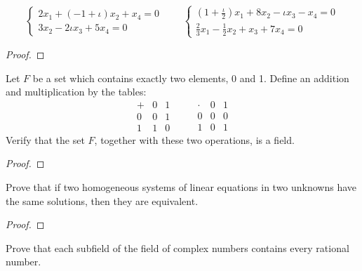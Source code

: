 \begin{exercise}
    \[
        \begin{cases}
            2x_{1} + (-1 + \iota)x_{2} + x_{4} = 0 \\
            3x_{2} - 2\iota x_{3} + 5x_{4} = 0
        \end{cases}
        \qquad
        \begin{cases}
            \left(1 + \frac{\iota}{2}\right)x_{1} + 8x_{2} - \iota x_{3} - x_{4} = 0 \\
            \frac{2}{3}x_{1} - \frac{1}{2}x_{2} + x_{3} + 7x_{4} = 0
        \end{cases}
    \]
\end{exercise}

\begin{proof}
\end{proof}

\begin{exercise}
    Let $F$ be a set which contains exactly two elements, 0 and 1. Define an addition and multiplication by the tables:
    \[
        \begin{array}{c|cc}
            + & 0 & 1 \\
            \hline
            0 & 0 & 1 \\
            1 & 1 & 0
        \end{array}
        \qquad
        \begin{array}{c|cc}
            \cdot & 0 & 1 \\
            \hline
            0 & 0 & 0 \\
            1 & 0 & 1
        \end{array}
    \]
    Verify that the set $F$, together with these two operations, is a field.
\end{exercise}

\begin{proof}
\end{proof}

\begin{exercise}
    Prove that if two homogeneous systems of linear equations in two unknowns have the same solutions, then they are equivalent.
\end{exercise}

\begin{proof}
\end{proof}

\begin{exercise}
    Prove that each subfield of the field of complex numbers contains every rational number.
\end{exercise}

